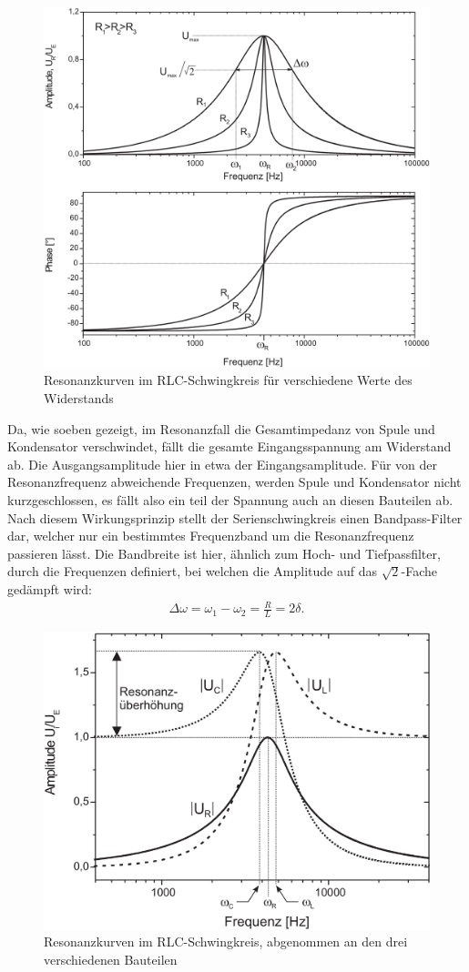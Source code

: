 \begin{figure}[H]
  \centering
  \includegraphics[width=.70\textwidth]{files/script/resonanzkurve_widerstaende.png}
  \caption{Resonanzkurven im RLC-Schwingkreis für verschiedene Werte des Widerstands}
  \label{fig:resonanzkurve_widerstaende}
\end{figure}

Da, wie soeben gezeigt, im Resonanzfall die Gesamtimpedanz von Spule und Kondensator verschwindet, fällt die gesamte Eingangsspannung am Widerstand ab. Die Ausgangsamplitude hier in etwa der Eingangsamplitude. Für von der Resonanzfrequenz abweichende Frequenzen, werden Spule und Kondensator nicht kurzgeschlossen, es fällt also ein teil der Spannung auch an diesen Bauteilen ab. Nach diesem Wirkungsprinzip stellt der Serienschwingkreis einen Bandpass-Filter dar, welcher nur ein bestimmtes Frequenzband um die Resonanzfrequenz passieren lässt. Die Bandbreite ist hier, ähnlich zum Hoch- und Tiefpassfilter, durch die Frequenzen definiert, bei welchen die Amplitude auf das $\sqrt{2}$-Fache gedämpft wird:
\begin{align}
  \Delta \omega = \omega_1 - \omega_2 = \frac{R}{L} = 2\delta.
\end{align}

\begin{figure}[H]
  \centering
  \includegraphics[width=.70\textwidth]{files/script/resonanzkurve_rlc.png}
  \caption{Resonanzkurven im RLC-Schwingkreis, abgenommen an den drei verschiedenen Bauteilen}
  \label{fig:resonanzkurve_rlc}
\end{figure}

